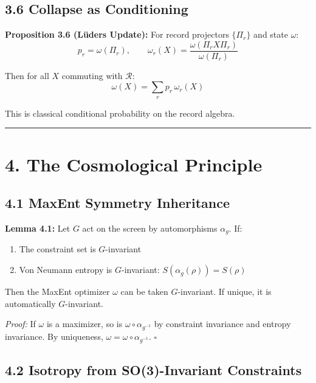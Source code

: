 \subsection{3.6 Collapse as Conditioning}\label{36-collapse-as-conditioning}

\textbf{Proposition 3.6 (L\"{u}ders Update):} For record projectors \(\{\Pi_r\}\) and state \(\omega\): \[p_r = \omega(\Pi_r), \qquad \omega_r(X) = \frac{\omega(\Pi_r X \Pi_r)}{\omega(\Pi_r)}\]

Then for all \(X\) commuting with \(\mathcal{R}\): \[\omega(X) = \sum_r p_r \, \omega_r(X)\]

This is classical conditional probability on the record algebra.

\begin{center}\rule{0.5\linewidth}{0.5pt}\end{center}

\section{4. The Cosmological Principle}\label{4-the-cosmological-principle}

\subsection{4.1 MaxEnt Symmetry Inheritance}\label{41-maxent-symmetry-inheritance}

\textbf{Lemma 4.1:} Let \(G\) act on the screen by automorphisms \(\alpha_g\). If:

\begin{enumerate}
\def\labelenumi{\arabic{enumi}.}
\tightlist
\item
  The constraint set is \(G\)-invariant
\item
  Von Neumann entropy is \(G\)-invariant: \(S(\alpha_g(\rho)) = S(\rho)\)
\end{enumerate}

Then the MaxEnt optimizer \(\omega\) can be taken \(G\)-invariant. If unique, it is automatically \(G\)-invariant.

\emph{Proof:} If \(\omega\) is a maximizer, so is \(\omega \circ \alpha_{g^{-1}}\) by constraint invariance and entropy invariance. By uniqueness, \(\omega = \omega \circ \alpha_{g^{-1}}\). \(\square\)

\subsection{4.2 Isotropy from SO(3)-Invariant Constraints}\label{42-isotropy-from-so3-invariant-constraints}

